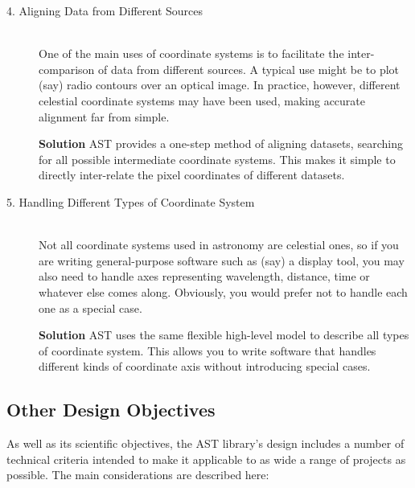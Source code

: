 \documentclass[twoside,11pt]{article}
\begin{document}
\begin{description}
\item[4. Aligning Data from Different Sources]\mbox{}\\
One of the main uses of coordinate systems is to facilitate the
inter-comparison of data from different sources. A typical use might
be to plot (say) radio contours over an optical image.  In practice,
however, different celestial coordinate systems may have been used,
making accurate alignment far from simple.

{\bf{Solution}} AST provides a one-step method of aligning datasets,
searching for all possible intermediate coordinate systems.  This
makes it simple to directly inter-relate the pixel coordinates of
different datasets.

\item[5. Handling Different Types of Coordinate Sy\mbox{}stem]\mbox{}\\
Not all coordinate systems used in astronomy are celestial ones, so if
you are writing general-purpose software such as (say) a display tool,
you may also need to handle axes representing wavelength, distance,
time or whatever else comes along. Obviously, you would prefer not to
handle each one as a special case.

{\bf{Solution}} AST uses the same flexible high-level model to
describe all types of coordinate system. This allows you to write
software that handles different kinds of coordinate axis without
introducing special cases.
\end{description}

\subsection{Other Design Objectives}

As well as its scientific objectives, the AST library's design
includes a number of technical criteria intended to make it applicable
to as wide a range of projects as possible. The main considerations
are described here:
\end{document}
